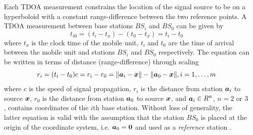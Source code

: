 Each TDOA measurement constrains the location of the signal source
to be on a hyperboloid with a constant range-difference between the two reference points. A TDOA measurement between base stations $BS_i$ and $BS_0$ can be given by 
\begin{equation}
\nonumber
t_{i0} = (t_i - t_x) - (t_0 - t_x) = t_i - t_0
\end{equation}
where $t_x$ is the clock time of the mobile unit, $t_i$ and $t_0$ are the time of arrival between the mobile unit and  stations $BS_i$ and $BS_0$ respectively. The equation can be written in terms of distance (range-difference) through scaling 
\begin{equation}
\nonumber
r_{i} =(t_i - t_0)c = r_i - r_0 = \|\mbox{\boldmath$a$}_i - \mbox{\boldmath$x$}\| - \|\mbox{\boldmath$a$}_0 - \mbox{\boldmath$x$}\|, i = 1,\ldots,m
\end{equation}
where $c$ is the speed of signal propagation, $r_i$ is the distance from station $\mbox{\boldmath$a$}_i$ to source $\mbox{\boldmath$x$}$, $r_0$ is the distance from station $\mbox{\boldmath$a$}_0$ to source $\mbox{\boldmath$x$}$, and $\mbox{\boldmath$a$}_i \in R^n$, $n = 2$ or $3$, contains coordinates of the $i$th base station.  Without loss of generality, the latter equation is valid with the assumption that the station $BS_0$ is placed at the origin of the coordinate system, i.e. $\mbox{\boldmath$a$}_0 = \mbox{\boldmath{$0$}}$  and used as a \textit{reference} station \cite{GeoLoc}. 
 

